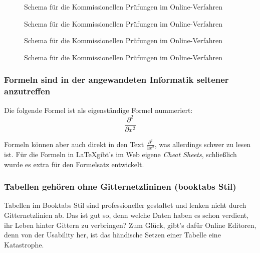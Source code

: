 \begin{figure}[h] %
	\centering
	
	\caption{Schema für die Kommissionellen Prüfungen im Online-Verfahren}
	\label{fig:my_label}
\end{figure}
\begin{figure}[h] %
	\centering
	
	\caption{Schema für die Kommissionellen Prüfungen im Online-Verfahren}
	\label{fig:my_label}
\end{figure}
\begin{figure}[h] %
	\centering
	
	\caption{Schema für die Kommissionellen Prüfungen im Online-Verfahren}
	\label{fig:my_label}
\end{figure}
\begin{figure}[h] %
	\centering
	
	\caption{Schema für die Kommissionellen Prüfungen im Online-Verfahren}
	\label{fig:my_label}
\end{figure}


\subsubsection{Formeln sind in der angewandeten Informatik seltener anzutreffen}
Die folgende Formel ist als eigenständige Formel nummeriert:
\begin{equation}
	\frac{\partial^2 }{\partial x^2}  %
\end{equation}


Formeln können aber auch direkt in den Text $\frac{\partial^2 }{\partial x^2}$, was allerdings schwer zu lesen ist.
Für die Formeln in \LaTeX gibt's im Web eigene \textit{Cheat Sheets}, schließlich wurde es extra für den Formelsatz entwickelt.


\subsubsection{Tabellen gehören ohne Gitternetzlininen (booktabs Stil)}
Tabellen im Booktabs Stil sind professioneller gestaltet und lenken nicht durch Gitternetzlinien ab. Das ist gut so, denn welche Daten haben es schon verdient, ihr Leben hinter Gittern zu verbringen?
Zum Glück, gibt's dafür Online Editoren, denn von der Usability her, ist das händische Setzen einer Tabelle eine Katastrophe.

